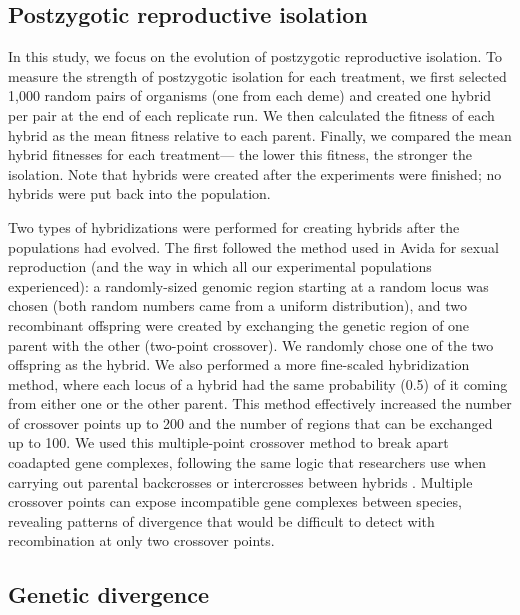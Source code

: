 \begin{doublespace}
\subsection{Postzygotic reproductive isolation}

In this study,
we focus on the evolution of postzygotic reproductive isolation.
%
To measure the strength of postzygotic isolation for each treatment,
we first selected 1,000 random pairs of organisms (one from each deme)
and created one hybrid per pair at the end of each replicate run.
%
We then calculated the fitness of each hybrid
as the mean fitness relative to each parent.
%
Finally, we compared the mean hybrid fitnesses for each treatment---%
the lower this fitness, the stronger the isolation.
%
Note that hybrids were created
after the experiments were finished;
no hybrids were put back into the population.



Two types of hybridizations were performed for creating hybrids
after the populations had evolved.
%
The first followed the method used in Avida for sexual reproduction
(and the way in which all our experimental populations experienced):
a randomly-sized genomic region starting at a random locus was chosen
(both random numbers came from a uniform distribution),
and two recombinant offspring were created by exchanging
the genetic region of one parent with the other (two-point crossover).
%
We randomly chose one of the two offspring as the hybrid.
%
We also performed a more fine-scaled hybridization method,
where each locus of a hybrid had the same probability (0.5)
of it coming from either one or the other parent.
%
This method effectively increased the number of crossover points up to 200
and the number of regions that can be exchanged up to 100.
%
We used this multiple-point crossover method
to break apart coadapted gene complexes,
following the same logic that researchers
use when carrying out parental backcrosses
or intercrosses between hybrids \citep[e.g.,][]{li97,bur99}.
%
Multiple crossover points can expose
incompatible gene complexes between species,
revealing patterns of divergence
that would be difficult to detect with
recombination at only two crossover points.



\subsection{Genetic divergence}




\end{doublespace}
